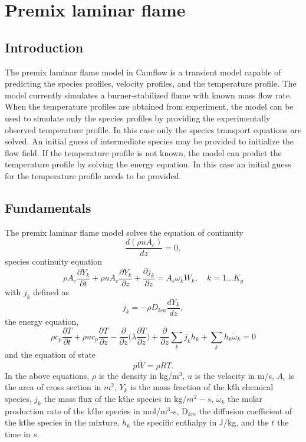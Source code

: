 
\newpage
\chapter{Premix laminar flame}

\section{Introduction}
The premix laminar flame model in Camflow is a transient model capable of predicting the species profiles, velocity profiles, and the temperature profile. The model currently simulates a burner-stabilized flame with known mass flow rate. When the temperature profiles are obtained from experiment, the model can be used to simulate only the species profiles by providing the experimentally observed temperature profile. In this case only the species transport equations are solved. An initial guess of intermediate species may be provided to initialize the flow field. If the temperature profile is not known, the model can predict the temperature profile by solving the energy equation. In this case an initial guess for the temperature profile needs to be provided. 

\section{Fundamentals}
The premix laminar flame model solves the equation of continuity
\begin{equation}
 \frac{d (\rho u A_c) }{dz} =0,
\end{equation}
species continuity equation
\begin{equation}
 \rho A_c \frac{\partial Y_k}{\partial t}+ \rho u A_c \frac{\partial Y_k}{\partial z} + \frac{\partial j_k}{\partial z} = A_c\dot{\omega}_k W_k, \quad k=1\ldots K_g
\end{equation}
with $j_k$ defined as
\begin{equation}
 j_k = -\rho D_{km} \frac{dY_k}{dz},
\end{equation}
the energy equation,
\begin{equation}
 \rho c_p \frac{\partial T}{\partial t}+ \rho u c_p \frac{\partial T}{\partial z} - \frac{\partial }{\partial z}\bigg(\lambda \frac{\partial T}{\partial z} \bigg) + \frac{\partial}{\partial z} \sum_k j_k h_{k}  + \sum_k h_k\dot{\omega}_k = 0
\end{equation}
and the equation of state
\begin{equation}
 p\bar{W}=\rho RT.
\end{equation}
In the above equations, $\rho$ is the density in kg/m$^3$, $u$ is the velocity in m/s, $A_c$ is the area of cross section in $m^2$, $Y_k$ is the mass fraction of the k\'th chemical species, $j_k$ the mass flux of the k\'the species in kg/$m^2-s$, $\dot{\omega}_k$ the molar production rate of the k\'the species in mol/m$^3$-s, D$_{km}$ the diffusion coefficient of the k\'the species in the mixture, $h_k$ the specific enthalpy in J/kg, and the $t$ the time in $s$.


